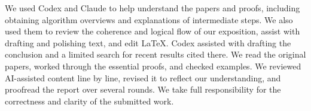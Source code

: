 We used Codex and Claude to help understand the papers and proofs,
including obtaining algorithm overviews and explanations of intermediate
steps. We also used them to review the coherence and logical flow of
our exposition, assist with drafting and polishing text, and edit LaTeX.
Codex assisted with drafting the conclusion and a limited search for
recent results cited there. We read the original papers, worked through
the essential proofs, and checked examples. We reviewed AI-assisted
content line by line, revised it to reflect our understanding, and
proofread the report over several rounds. We take full responsibility
for the correctness and clarity of the submitted work.
